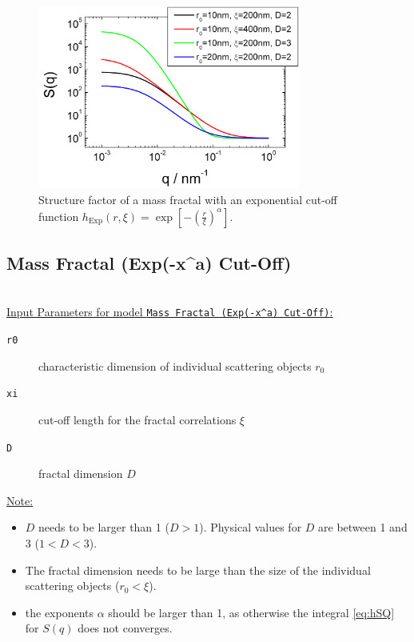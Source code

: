 \begin{figure}[htb]
\begin{center}
\includegraphics[width=0.768\textwidth,height=0.488\textwidth]{../images/structure_factor/MassFractals/SQExpCutOff.png}
\end{center}
\caption{Structure factor of a mass fractal with an exponential
cut-off function $h_\text{Exp}(r,\xi) = \exp\left[-\left(\tfrac{r}{\xi}\right)^\alpha\right]$.}
\label{fig:SQExpCutOff}
\end{figure}


\clearpage
\subsection{Mass Fractal (Exp(-x\^{}a) Cut-Off)}
~\\

\underline{Input Parameters for model \texttt{Mass Fractal (Exp(-x\^{}a) Cut-Off)}:}
\begin{description}
\item[\texttt{r0}] characteristic dimension of individual scattering objects $r_0$
\item[\texttt{xi}] cut-off length for the fractal correlations $\xi$
\item[\texttt{D}] fractal dimension $D$
\end{description}

\underline{Note:}
\begin{itemize}
\item $D$ needs to be larger than 1 ($D>1$). Physical values for $D$ are between 1 and 3 ($1<D<3$).
\item The fractal dimension needs to be large than the size of the individual scattering objects ($r_0 < \xi$).
\item the exponents $\alpha$ should be larger than 1, as otherwise the integral \ref{eq:hSQ} for $S(q)$ does not converges.
\end{itemize}

